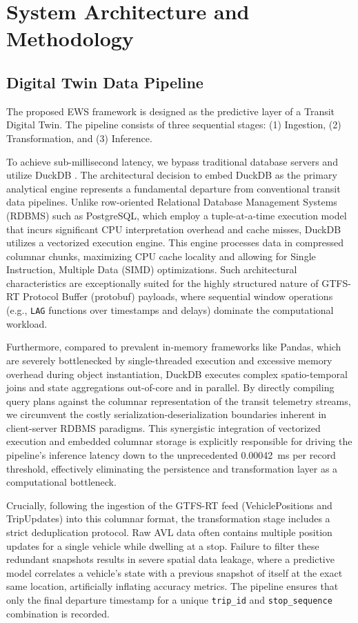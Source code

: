 \documentclass[journal,twocolumn]{IEEEtran}
\begin{document}
\section{System Architecture and Methodology}

\subsection{Digital Twin Data Pipeline}
The proposed EWS framework is designed as the predictive layer of a Transit Digital Twin. The pipeline consists of three sequential stages: (1) Ingestion, (2) Transformation, and (3) Inference.

To achieve sub-millisecond latency, we bypass traditional database servers and utilize DuckDB \cite{14}. The architectural decision to embed DuckDB as the primary analytical engine represents a fundamental departure from conventional transit data pipelines. Unlike row-oriented Relational Database Management Systems (RDBMS) such as PostgreSQL, which employ a tuple-at-a-time execution model that incurs significant CPU interpretation overhead and cache misses, DuckDB utilizes a vectorized execution engine. This engine processes data in compressed columnar chunks, maximizing CPU cache locality and allowing for Single Instruction, Multiple Data (SIMD) optimizations. Such architectural characteristics are exceptionally suited for the highly structured nature of GTFS-RT Protocol Buffer (protobuf) payloads, where sequential window operations (e.g., \texttt{LAG} functions over timestamps and delays) dominate the computational workload.

Furthermore, compared to prevalent in-memory frameworks like Pandas, which are severely bottlenecked by single-threaded execution and excessive memory overhead during object instantiation, DuckDB executes complex spatio-temporal joins and state aggregations out-of-core and in parallel. By directly compiling query plans against the columnar representation of the transit telemetry streams, we circumvent the costly serialization-deserialization boundaries inherent in client-server RDBMS paradigms. This synergistic integration of vectorized execution and embedded columnar storage is explicitly responsible for driving the pipeline's inference latency down to the unprecedented \SI{0.00042}{\ms} per record threshold, effectively eliminating the persistence and transformation layer as a computational bottleneck.

Crucially, following the ingestion of the GTFS-RT feed (VehiclePositions and TripUpdates) into this columnar format, the transformation stage includes a strict deduplication protocol. Raw AVL data often contains multiple position updates for a single vehicle while dwelling at a stop. Failure to filter these redundant snapshots results in severe spatial data leakage, where a predictive model correlates a vehicle's state with a previous snapshot of itself at the exact same location, artificially inflating accuracy metrics. The pipeline ensures that only the final departure timestamp for a unique \texttt{trip\_id} and \texttt{stop\_sequence} combination is recorded.
\end{document}
